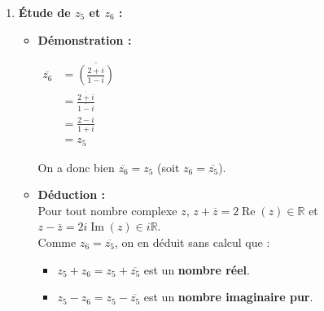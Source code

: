 \documentclass[12pt,a4paper]{article}
\begin{document}
\begin{enumerate}
\begin{enumerate}
        \textit{Mise sous forme algébrique :}
        
        $\begin{aligned}
            \overline{z_4} &= \frac{-2i(3 + i)}{(3 - i)(3 + i)} - \frac{3(2 + i)}{(2 - i)(2 + i)} \\
            &= \frac{-6i - 2i^2}{9 + 1} - \frac{6 + 3i}{4 + 1} \\
            &= \frac{2 - 6i}{10} - \frac{6 + 3i}{5} \\
            &= \frac{1 - 3i}{5} - \frac{6 + 3i}{5} \\
            &= \mathbf{-1 - \frac{6}{5}i}
        \end{aligned}$
        
    \end{enumerate}

    \item \textbf{Étude de $z_5$ et $z_6$ :}
    \begin{itemize}
        \item \textbf{Démonstration :}
        
        $\begin{aligned}
            \overline{z_6} &= \overline{\left(\frac{2 + i}{1 - i}\right)} \\
            &= \frac{\overline{2 + i}}{\overline{1 - i}} \\
            &= \frac{2 - i}{1 + i} \\
            &= z_5
        \end{aligned}$
        
        On a donc bien $\overline{z_6} = z_5$ (soit $z_6 = \overline{z_5}$).

        \item \textbf{Déduction :} \\
        Pour tout nombre complexe $z$, $z + \overline{z} = 2\operatorname{Re}(z) \in \mathbb{R}$ et $z - \overline{z} = 2i\operatorname{Im}(z) \in i\mathbb{R}$. \\
        Comme $z_6 = \overline{z_5}$, on en déduit sans calcul que :
        \begin{itemize}
            \item $z_5 + z_6 = z_5 + \overline{z_5}$ est un \textbf{nombre réel}.
            \item $z_5 - z_6 = z_5 - \overline{z_5}$ est un \textbf{nombre imaginaire pur}.
        \end{itemize}
    \end{itemize}
\end{enumerate}
\end{document}

